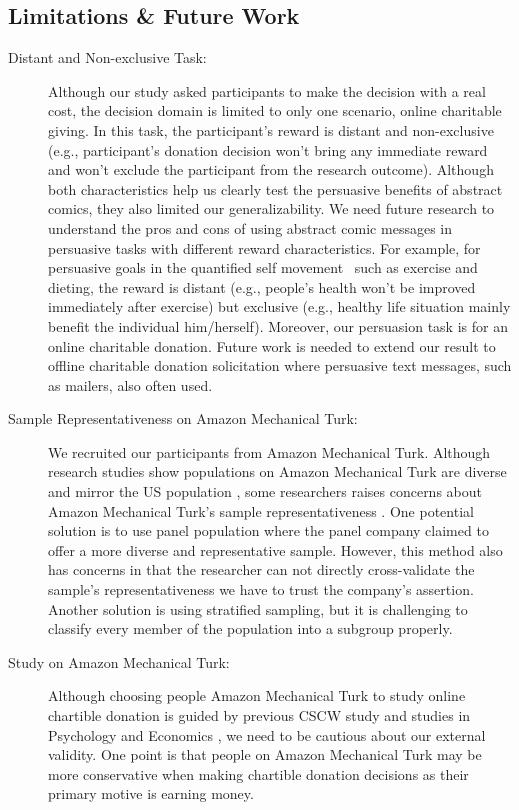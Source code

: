 \subsection{Limitations \& Future Work}
\begin{description}

 \item[Distant and Non-exclusive Task:]  Although our study asked participants to make the decision with a real cost, the decision domain is limited to only one scenario, online charitable giving. In this task, the participant's reward is distant and non-exclusive (e.g., participant's donation decision won't bring any immediate reward and won't exclude the participant from the research outcome). Although both characteristics help us clearly test the persuasive benefits of abstract comics, they also limited our generalizability. We need future research to understand the pros and cons of using abstract comic messages in persuasive tasks with different reward characteristics. For example, for persuasive goals in the quantified self movement~\cite{Epstein2014,Choe2014} such as exercise and dieting, the reward is distant (e.g., people's health won't be improved immediately after exercise) but exclusive (e.g., healthy life situation mainly benefit the individual him/herself). Moreover, our persuasion task is for an online charitable donation. Future work is needed to extend our result to offline charitable donation solicitation where persuasive text messages, such as mailers, also often used. 

\item[Sample Representativeness on Amazon Mechanical Turk:] We recruited our participants from Amazon Mechanical Turk. Although research studies show populations on Amazon Mechanical Turk are diverse and mirror the US population \cite{buhrmester2011amazon,behrend2011viability,berinsky2012evaluating}, some researchers raises concerns about Amazon Mechanical Turk's sample representativeness \cite{landers2015inconvenient,paolacci2010running}. One potential solution is to use panel population where the panel company claimed to offer a more diverse and representative sample.
However, this method also has concerns in that the researcher can not directly cross-validate the sample's representativeness we have to trust the company's assertion. Another solution is using stratified sampling, but it is challenging to classify every member of the population into a subgroup properly. 

\item[Study on Amazon Mechanical Turk:] Although choosing people Amazon Mechanical Turk to study online chartible donation is guided by previous CSCW study \cite{lee2013does} and studies in Psychology \cite{saunders2016no,sussman2015framing} and Economics \cite{arechar2017turking}, we need to be cautious about our external validity. One point is that people on Amazon Mechanical Turk may be more conservative when making chartible donation decisions as their primary motive is earning money. 
  

\end{description}
